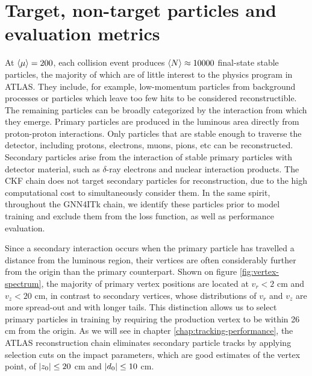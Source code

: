 \section{Target, non-target particles and evaluation metrics}
\label{sect:eval-metrics}
At $\expval{\mu}=200$, each collision event produces $\expval{N}\approx 10000$ final-state stable particles, the majority of which are of little interest to the physics program in ATLAS. 
They include, for example, low-momentum particles from background processes or particles which leave too few hits to be considered reconstructible.
The remaining particles can be broadly categorized by the interaction from which they emerge. 
Primary particles are produced in the luminous area directly from proton-proton interactions. 
Only particles that are stable enough to traverse the detector, including protons, electrons, muons, pions, etc can be reconstructed.
Secondary particles arise from the interaction of stable primary particles with detector material, such as $\delta$-ray electrons and nuclear interaction products. 
The CKF chain does not target secondary particles for reconstruction, due to the high computational cost to simultaneously consider them.
In the same spirit, throughout the GNN4ITk chain, we identify these particles prior to model training and exclude them from the loss function, as well as performance evaluation.

Since a secondary interaction occurs when the primary particle has travelled a distance from the luminous region, their vertices are often considerably further from the origin than the primary counterpart. 
Shown on figure \ref{fig:vertex-spectrum}, the majority of primary vertex positions are located at $v_r < 2$ cm and $v_z < 20$ cm, in contrast to secondary vertices, whose distributions of $v_r$ and $v_z$ are more spread-out and with longer tails.
This distinction allows us to select primary particles in training by requiring the production vertex to be within 26 cm from the origin.
As we will see in chapter \ref{chap:tracking-performance}, the ATLAS reconstruction chain eliminates secondary particle tracks by applying selection cuts on the impact parameters, which are good estimates of the vertex point, of $\abs{z_0}\le 20$ cm and $\abs{d_0}\le10$ cm. 

